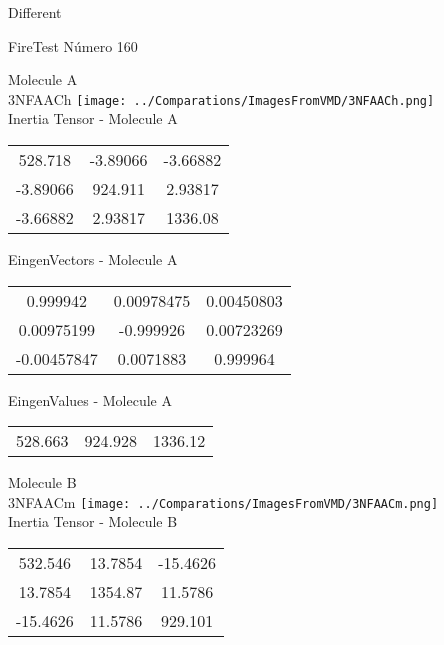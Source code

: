 \begin{center}
\vtab
\vtab
\textcolor{NavyBlue}{\Large Different}
\end{center}

 \newpage

\vtab[-2cm]
\begin{center}
{\large FireTest \tab Número 160}
\end{center}
\begin{multicols}{2}
\begin{center}

Molecule A \\ 
3NFAACh
\texttt{[image: ../Comparations/ImagesFromVMD/3NFAACh.png]}
\\
Inertia Tensor - Molecule A \\
\vtab

\begin{tabular}{|c c c|}
528.718	 & 	-3.89066	 & 	-3.66882	 \\
-3.89066	 & 	924.911	 & 	2.93817	 \\
-3.66882	 & 	2.93817	 & 	1336.08
\end{tabular}

\vtab
 EingenVectors - Molecule A     \\
\vtab
\begin{tabular}{|c c c|}
0.999942	 & 	0.00978475	 & 	0.00450803	 \\
0.00975199	 & 	-0.999926	 & 	0.00723269	 \\
-0.00457847	 & 	0.0071883	 & 	0.999964
\end{tabular}

\vtab
 EingenValues - Molecule A     \\
\vtab
\begin{tabular}{|c c c|}
528.663	 & 	924.928	 & 	1336.12	 \\
\end{tabular}
\columnbreak

Molecule B \\ 
3NFAACm
\texttt{[image: ../Comparations/ImagesFromVMD/3NFAACm.png]}
\\
Inertia Tensor - Molecule B \\
\vtab

\begin{tabular}{|c c c|}
532.546	 & 	13.7854	 & 	-15.4626	 \\
13.7854	 & 	1354.87	 & 	11.5786	 \\
-15.4626	 & 	11.5786	 & 	929.101
\end{tabular}


\end{center}
\end{multicols}
